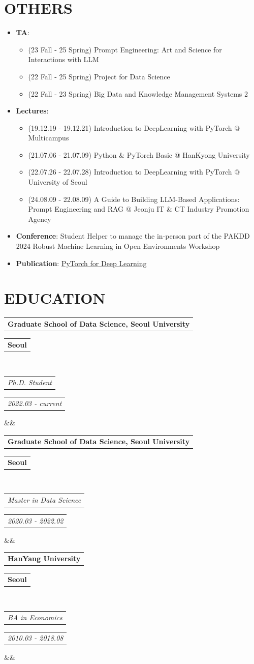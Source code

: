 \documentclass[11pt,a4paper,roman]{moderncv}        %
\makeatletter
\newcommand*{\customcventry}[7][.25em]{
  \begin{tabular}{@{}l} 
    {\bfseries #4}
  \end{tabular}
  \hfill%
  \begin{tabular}{l@{}}
     {\bfseries #5}
  \end{tabular} \\
  \begin{tabular}{@{}l} 
    {\itshape #3}
  \end{tabular}
  \hfill%
  \begin{tabular}{l@{}}
     {\itshape #2}
  \end{tabular}
  \ifx&#7&%
  \else{\\%
    \begin{minipage}{\maincolumnwidth}%
      \small#7%
    \end{minipage}}\fi%
  \par\addvspace{#1}}
\makeatother
\begin{document}
\section{OTHERS}
\begin{minipage}{\maincolumnwidth}%
\small{
\begin{itemize}
  \item \textbf{TA}: 
  \begin{itemize}
    \item (23 Fall - 25 Spring) Prompt Engineering: Art and Science for Interactions with LLM 
    \item (22 Fall - 25 Spring) Project for Data Science
    \item (22 Fall - 23 Spring) Big Data and Knowledge Management Systems 2
  \end{itemize}
  \item \textbf{Lectures}: 
    \begin{itemize}
      \item (19.12.19 - 19.12.21) Introduction to DeepLearning with PyTorch @ Multicampus
      \item (21.07.06 - 21.07.09) Python \& PyTorch Basic @ HanKyong University
      \item (22.07.26 - 22.07.28) Introduction to DeepLearning with PyTorch @ University of Seoul
      \item (24.08.09 - 22.08.09) A Guide to Building LLM-Based Applications: Prompt Engineering and RAG @ Jeonju IT \& CT Industry Promotion Agency
    \end{itemize}
  \item \textbf{Conference}: Student Helper to manage the in-person part of the PAKDD 2024 Robust Machine Learning in Open Environments Workshop
  \item \textbf{Publication}: \href{https://product.kyobobook.co.kr/detail/S000001934223}{PyTorch for Deep Learning}
  
\end{itemize}}%
\end{minipage}%


\vspace{5pt}
\section{EDUCATION}
{\customcventry{2022.03 - current}{Ph.D. Student}{Graduate School of Data Science, Seoul University}{Seoul}{}{}}
{\customcventry{2020.03 - 2022.02}{Master in Data Science}{Graduate School of Data Science, Seoul University}{Seoul}{}{}}
{\customcventry{2010.03 - 2018.08}{BA in Economics}{HanYang University}{Seoul}{}{}}
\end{document}
